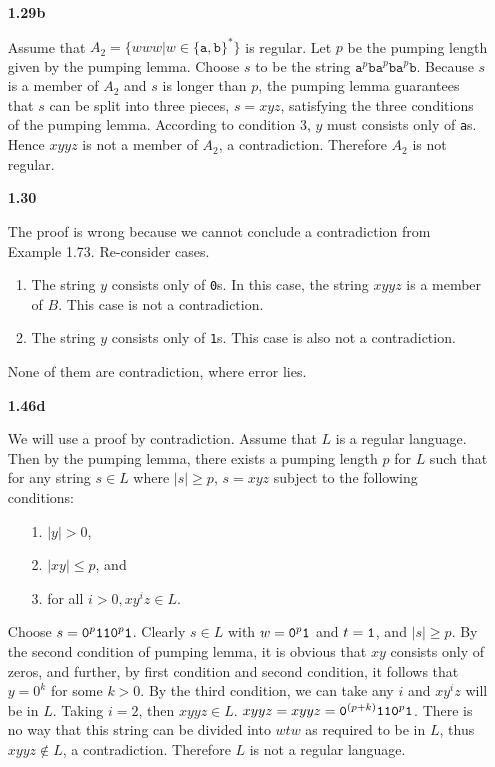 \begin{enumerate}

    \item[{\bf 1.29b}]
    
    Assume that $A_2=\{www|w\in\{\texttt{a},\texttt{b}\}^\ast\}$ is regular. Let $p$ be the pumping length given by the pumping lemma. Choose $s$ to be the string $\texttt{a}^p\texttt{ba}^p\texttt{ba}^p\texttt{b}$. Because $s$ is a member of $A_2$ and $s$ is longer than $p$, the pumping lemma guarantees that $s$ can be split into three pieces, $s=xyz$, satisfying the three conditions of the pumping lemma. According to condition 3, $y$ must consists only of {\tt a}s. Hence $xyyz$ is not a member of $A_2$, a contradiction. Therefore $A_2$ is not regular.
    
    \item[{\bf 1.30}]
    
    The proof is wrong because we cannot conclude a contradiction from Example 1.73. Re-consider cases.
    
    \begin{enumerate}
    \item The string $y$ consists only of {\tt 0}s. In this case, the string $xyyz$ is a member of $B$. This case is not a contradiction.
    \item The string $y$ consists only of {\tt 1}s. This case is also not a contradiction.
    \end{enumerate}
    
    None of them are contradiction, where error lies.
    
    \item[{\bf 1.46d}]
    
    We will use a proof by contradiction. Assume that $L$ is a regular language. Then by the pumping lemma, there exists a pumping length $p$ for $L$ such that for any string $s\in L$ where $|s|\ge p$, $s=xyz$ subject to the following conditions:
    
    \begin{enumerate}
    \item[1.] $|y| > 0$,
    \item[2.] $|xy|\le p$, and
    \item[3.] for all $i>0,xy^iz\in L$.
    \end{enumerate}
    
    Choose $s={\tt 0}^p{\tt 110}^p{\tt 1}$. Clearly $s\in L$ with $w={\tt 0}^p{\tt 1}$ and $t={\tt 1}$, and $|s|\ge p$. By the second condition of pumping lemma, it is obvious that $xy$ consists only of zeros, and further, by first condition and second condition, it follows that $y = 0^k$ for some $k > 0$. By the third condition, we can take any $i$ and $xy^iz$ will be in $L$. Taking $i = 2$, then $xyyz\in L$. $xyyz = xyyz = {\tt 0}^{(p+k)}{\tt 110}^p{\tt 1}$. There is no way that this string can be divided into $wtw$ as required to be in $L$, thus $xyyz\notin L$, a contradiction. Therefore $L$ is not a regular language.
    

\end{enumerate}
